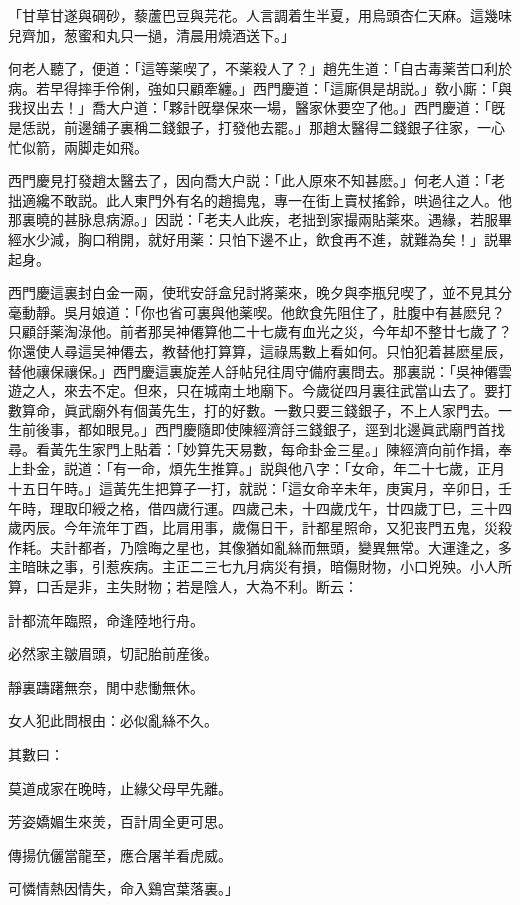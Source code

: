 「甘草甘遂與碙砂，藜蘆巴豆與芫花。人言調着生半夏，用烏頭杏仁天麻。這幾味兒齊加，葱蜜和丸只一撾，清晨用燒酒送下。」

何老人聽了，便道：「這等薬喫了，不薬殺人了？」趙先生道：「自古毒薬苦口利於病。若早得摔手伶俐，強如只顧牽纏。」西門慶道：「這廝俱是胡説。」敎小廝：「與我扠出去！」喬大户道：「夥計旣擧保來一場，醫家休要空了他。」西門慶道：「旣是恁説，前邊舖子裏稱二錢銀子，打發他去罷。」那趙太醫得二錢銀子往家，一心忙似箭，兩脚走如飛。

西門慶見打發趙太醫去了，因向喬大户説：「此人原來不知甚麽。」何老人道：「老拙適纔不敢説。此人東門外有名的趙搗鬼，專一在街上賣杖搖鈴，哄過往之人。他那裏曉的甚脉息病源。」因説：「老夫人此疾，老拙到家撮兩貼薬來。遇緣，若服畢經水少減，胸口稍開，就好用薬：只怕下邊不止，飲食再不進，就難為矣！」説畢起身。

西門慶這裏封白金一兩，使玳安㧱盒兒討將薬來，晚夕與李瓶兒喫了，並不見其分毫動靜。吳月娘道：「你也省可裏與他薬喫。他飲食先阻住了，肚腹中有甚麽兒？只顧㧱薬淘淥他。前者那吴神僊算他二十七歲有血光之災，今年却不整廿七歲了？你還使人尋這吴神僊去，教替他打算算，這祿馬數上看如何。只怕犯着甚麽星辰，替他禳保禳保。」西門慶這裏旋差人㧱帖兒往周守備府裏問去。那裏説：「吳神僊雲遊之人，來去不定。但來，只在城南土地廟下。今歲従四月裏往武當山去了。要打數算命，眞武廟外有個黃先生，打的好數。一數只要三錢銀子，不上人家門去。一生前後事，都如眼見。」西門慶隨即使陳經濟㧱三錢銀子，逕到北邊眞武廟門首找尋。看黃先生家門上貼着：「妙算先天易數，每命卦金三星。」陳經濟向前作揖，奉上卦金，説道：「有一命，煩先生推算。」説與他八字：「女命，年二十七歲，正月十五日午時。」這黃先生把算子一打，就説：「這女命辛未年，庚寅月，辛卯日，壬午時，理取印綬之格，借四歲行運。四歲己未，十四歲戊午，廿四歲丁巳，三十四歲丙辰。今年流年丁酉，比肩用事，歲傷日干，計都星照命，又犯丧門五鬼，災殺作耗。夫計都者，乃陰晦之星也，其像猶如亂絲而無頭，變異無常。大運逢之，多主暗昧之事，引惹疾病。主正二三七九月病災有損，暗傷財物，小口兇殃。小人所算，口舌是非，主失財物；若是陰人，大為不利。断云：

計都流年臨照，命逢陸地行舟。

必然家主皺眉頭，切記胎前産後。

靜裏躊躇無奈，閒中悲慟無休。

女人犯此問根由：必似亂絲不久。　

其數曰：

莫道成家在晚時，止緣父母早先離。

芳姿嬌媚生來羙，百計周全更可思。

傳揚伉儷當龍至，應合屠羊看虎威。

可憐情熱因情失，命入鷄宫葉落裏。」

